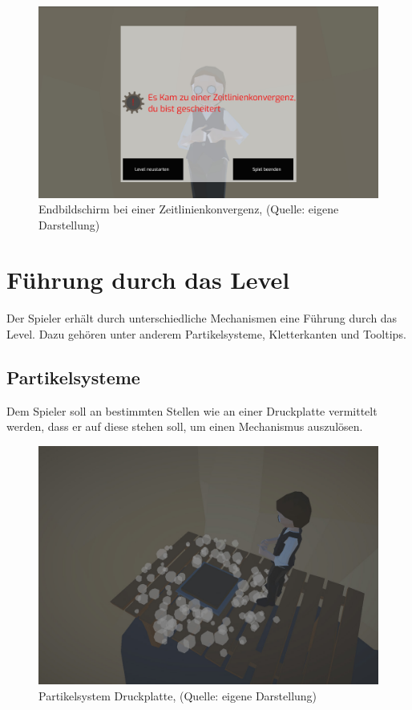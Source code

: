\begin{figure}[ht]
\centering
\includegraphics[width=1\linewidth]{content/pictures/DeathScreen.jpg}
\caption{Endbildschirm bei einer Zeitlinienkonvergenz, (Quelle: eigene Darstellung)}
\label{fig:deathscreen}
\end{figure}

\section{Führung durch das Level}\label{sec:level-integrated-huds}
Der Spieler erhält durch unterschiedliche Mechanismen eine Führung durch das Level. Dazu gehören unter anderem Partikelsysteme, Kletterkanten und Tooltips.
\subsection{Partikelsysteme}\label{sec:particle-system}
Dem Spieler soll an bestimmten Stellen wie an einer Druckplatte vermittelt werden, dass er auf diese stehen soll, um einen Mechanismus auszulösen.

\begin{figure}[ht]
\centering
\includegraphics[width=0.8\linewidth]{content/pictures/Pressureplate_tooltip.jpg}
\caption{Partikelsystem Druckplatte, (Quelle: eigene Darstellung)}
\label{fig:pressureplate_tooltip}
\end{figure}


